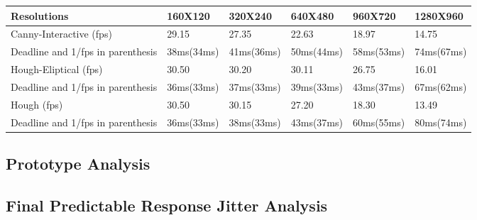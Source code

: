 \documentclass{article}
\begin{document}
\begin{table}[H]
    \centering
    \begin{tabular}{|l|l|l|l|l|l|}\hline
        Resolutions &160X120 &320X240 & 640X480& 960X720& 1280X960\\\hline
        Canny-Interactive (fps)&29.15 & 27.35 &22.63& 18.97 & 14.75 \\\hline
        Deadline and 1/fps in parenthesis & 38ms(34ms) & 41ms(36ms) & 50ms(44ms) & 58ms(53ms) & 74ms(67ms)\\\hline
        Hough-Eliptical (fps)&30.50 &30.20 &30.11 &26.75 &16.01\\\hline
        Deadline and 1/fps in parenthesis & 36ms(33ms) & 37ms(33ms) & 39ms(33ms)& 43ms(37ms) & 67ms(62ms)\\\hline
        Hough (fps)&30.50 &30.15 &27.20 &18.30 &13.49\\\hline
        Deadline and 1/fps in parenthesis & 36ms(33ms) & 38ms(33ms) & 43ms(37ms)& 60ms(55ms) & 80ms(74ms)\\\hline
    \end{tabular}
\end{table}

\subsection*{Prototype Analysis}

\subsection*{Final Predictable Response Jitter Analysis}
\end{document}
